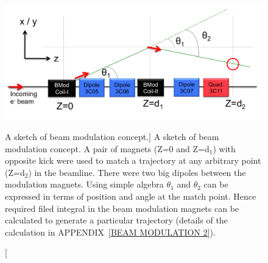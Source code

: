 \begin{singlespace}
\begin{figure}[!h]
	\begin{center}
	\includegraphics[width=15.0cm]{figures/BModDrawing}
	\end{center}
	\caption
	[A sketch of beam modulation concept.]
	{A sketch of beam modulation concept. A pair of magnets (Z=0 and Z=d$_{1}$) with opposite kick were used to match a trajectory at any arbitrary point (Z=d$_{2}$) in the beamline. There were two big dipoles between the modulation magnets. Using simple algebra $\theta_{1}$ and $\theta_{2}$ can be expressed in terms of position and angle at the match point. Hence required filed integral in the beam modulation magnets can be calculated to generate a particular trajectory (details of the calculation in APPENDIX~\ref{BEAM MODULATION 2}).}
	\label{fig:BModDrawing}
\end{figure}
\end{singlespace}

